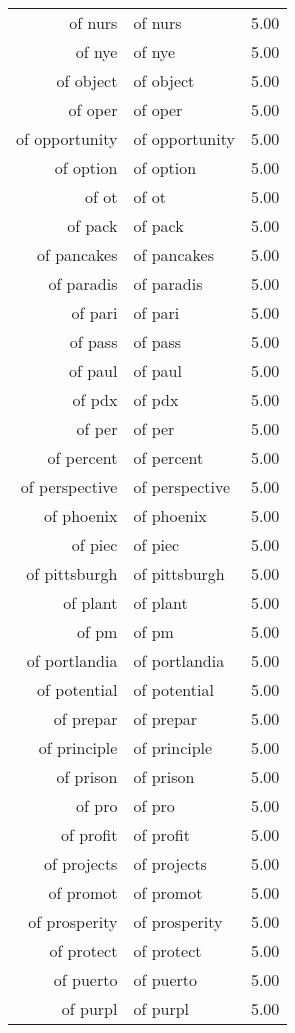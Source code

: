 \begin{table}[ht]
\begin{tabular}{rlr}
  of nurs & of nurs & 5.00 \\ 
  of nye & of nye & 5.00 \\ 
  of object & of object & 5.00 \\ 
  of oper & of oper & 5.00 \\ 
  of opportunity & of opportunity & 5.00 \\ 
  of option & of option & 5.00 \\ 
  of ot & of ot & 5.00 \\ 
  of pack & of pack & 5.00 \\ 
  of pancakes & of pancakes & 5.00 \\ 
  of paradis & of paradis & 5.00 \\ 
  of pari & of pari & 5.00 \\ 
  of pass & of pass & 5.00 \\ 
  of paul & of paul & 5.00 \\ 
  of pdx & of pdx & 5.00 \\ 
  of per & of per & 5.00 \\ 
  of percent & of percent & 5.00 \\ 
  of perspective & of perspective & 5.00 \\ 
  of phoenix & of phoenix & 5.00 \\ 
  of piec & of piec & 5.00 \\ 
  of pittsburgh & of pittsburgh & 5.00 \\ 
  of plant & of plant & 5.00 \\ 
  of pm & of pm & 5.00 \\ 
  of portlandia & of portlandia & 5.00 \\ 
  of potential & of potential & 5.00 \\ 
  of prepar & of prepar & 5.00 \\ 
  of principle & of principle & 5.00 \\ 
  of prison & of prison & 5.00 \\ 
  of pro & of pro & 5.00 \\ 
  of profit & of profit & 5.00 \\ 
  of projects & of projects & 5.00 \\ 
  of promot & of promot & 5.00 \\ 
  of prosperity & of prosperity & 5.00 \\ 
  of protect & of protect & 5.00 \\ 
  of puerto & of puerto & 5.00 \\ 
  of purpl & of purpl & 5.00 \\ 

\end{tabular}
\end{table}
